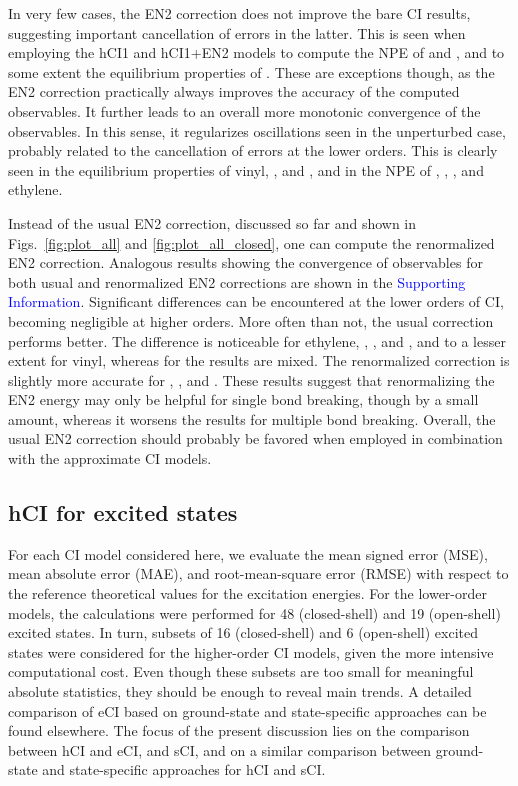 \documentclass[aip,jcp,reprint,noshowkeys,superscriptaddress]{revtex4-1}
\newcommand{\SupInf}{\textcolor{blue}{Supporting Information}}
\begin{document}
In very few cases, the EN2 correction does not improve the bare CI results, suggesting important cancellation of errors in the latter.
This is seen when employing the hCI1 and hCI1+EN2 models to compute the NPE of  and , and to some extent the equilibrium properties of .
These are exceptions though, as the EN2 correction practically always improves the accuracy of the computed observables.
It further leads to an overall more monotonic convergence of the observables.
In this sense, it regularizes oscillations seen in the unperturbed case, probably related to the cancellation of errors at the lower orders.
This is clearly seen in the equilibrium properties of vinyl, , and ,
and in the NPE of , , , and ethylene.

Instead of the usual EN2 correction, discussed so far and shown in Figs.~\ref{fig:plot_all} and \ref{fig:plot_all_closed},
one can compute the renormalized EN2 correction. \cite{Garniron_2019}
Analogous results showing the convergence of observables for both usual and renormalized EN2 corrections are shown in the {\SupInf}.
Significant differences can be encountered at the lower orders of CI, becoming negligible at higher orders.
More often than not, the usual correction performs better.
The difference is noticeable for ethylene, , , and , and to a lesser extent for vinyl,
whereas for  the results are mixed.
The renormalized correction is slightly more accurate for , , and .
These results suggest that renormalizing the EN2 energy may only be helpful for single bond breaking, though by a small amount,
whereas it worsens the results for multiple bond breaking.
Overall, the usual EN2 correction should probably be favored when employed in combination with the approximate CI models.


\subsection{hCI for excited states}
\label{sec:res_C}

For each CI model considered here, we evaluate the mean signed error (MSE), mean absolute error (MAE), and root-mean-square error (RMSE)
with respect to the reference theoretical values for the excitation energies.
For the lower-order models, the calculations were performed for 48 (closed-shell) and 19 (open-shell) excited states.
In turn, subsets of 16 (closed-shell) and 6 (open-shell) excited states were considered for the higher-order CI models, given the more intensive computational cost.
Even though these subsets are too small for meaningful absolute statistics, they should be enough to reveal main trends.
A detailed comparison of eCI based on ground-state and state-specific approaches can be found elsewhere. \cite{Kossoski_2023}
The focus of the present discussion lies on the comparison between hCI and eCI, and sCI,
and on a similar comparison between ground-state and state-specific approaches for hCI and sCI.
\end{document}
